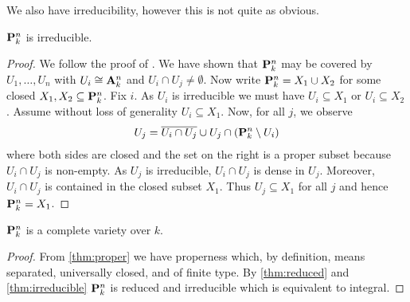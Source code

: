\documentclass{article}
\begin{document}
We also have irreducibility, however this is not quite as obvious.

\begin{theorem}\label{thm:irreducible}
  $\mathbf{P}^{n}_{k}$ is irreducible.
  \begin{proof}
    We follow the proof of \cite[\href{https://stacks.math.columbia.edu/tag/01OL}{Tag 01OL}]{stacks-project}.
    We have shown that $\mathbf{P}^{n}_{k}$ may be covered by $U_1,\ldots,U_n$ with
    $U_i \cong \mathbf{A}^{n}_{k}$ and $U_i\cap U_j\neq\emptyset$. Now write
    $\mathbf{P}^{n}_{k}=X_1 \cup X_2$ for some closed
    $X_1,X_2\subseteq \mathbf{P}^{n}_{k}$.
    Fix $i$. As $U_i$ is irreducible we must have
    $U_i\subseteq X_1$ or $U_i\subseteq X_2$. Assume without loss
    of generality $U_i\subseteq X_1$. Now, for all $j$,
    we observe
    \begin{align*}
      U_j = \overline{U_i\cap U_j}\cup U_j\cap(\mathbf{P}^{n}_{k}\setminus U_i)
    \end{align*}
    where both sides are closed and the set on the right is a proper
    subset because $U_i\cap U_j$ is non-empty. As $U_j$ is irreducible,
    $U_i\cap U_j$ is dense in $U_j$. Moreover, $U_i \cap U_j$ is
    contained in the closed subset $X_1$. Thus $U_j\subseteq X_1$
    for all $j$ and hence $\mathbf{P}^{n}_{k}=X_1$.
  \end{proof}
\end{theorem}

\begin{corollary}
  $\mathbf{P}^{n}_{k}$ is a complete variety over $k$.
  \begin{proof}
    From \ref{thm:proper} we have properness which, by definition,
    means separated, universally closed, and of finite type. By
    \ref{thm:reduced} and \ref{thm:irreducible} $\mathbf{P}^{n}_{k}$
    is reduced and irreducible which is equivalent to integral.
  \end{proof}
\end{corollary}

\printbibliography
\end{document}
